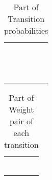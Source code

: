 \documentclass[10pt, conference, compsocconf]{IEEEtran}
\begin{document}
\begin{table}[h]
\centering
\scriptsize
\caption{\label{statetransition} Part of Transition probabilities}
\begin{tabular}{lll}\hline
         &        &\\
                        &                         &\\
                          &                         &\\
                      &                             &\\
                &             &\\
                &             &\\
         &        &\\
                &             &\\
                &             &\\
                &             &\\
                &             &\\
                &             &\\
                &             &\\
\hline
\end{tabular}
\end{table}

\begin{table}[h]
\scriptsize
\centering
\caption{\label{rewardcost} Part of Weight pair of each transition}
\begin{tabular}{ll}\hline
           &  \\
                 &   \\
                 &\\
              &\\
          &\\
          &\\
\hline
\end{tabular}
\end{table}
\end{document}
